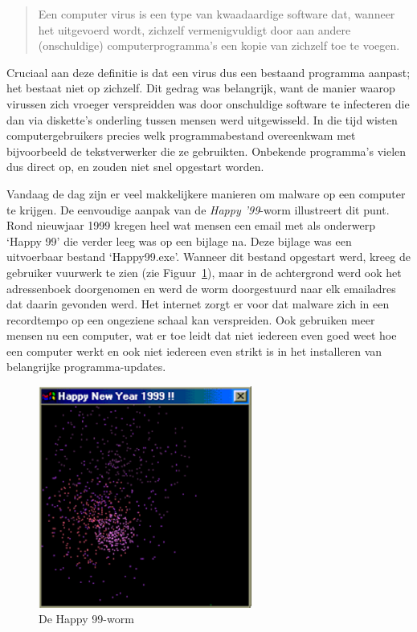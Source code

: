 \begin{quotation}
Een computer virus is een type van kwaadaardige software dat, wanneer het uitgevoerd wordt, zichzelf vermenigvuldigt door aan andere (onschuldige) computerprogramma's een kopie van zichzelf toe te voegen.
\end{quotation}

Cruciaal aan deze definitie is dat een virus dus een bestaand programma aanpast; het bestaat niet op zichzelf. Dit gedrag was belangrijk, want de manier waarop virussen zich vroeger verspreidden was door onschuldige software te infecteren die dan via diskette's onderling tussen mensen werd uitgewisseld. In die tijd wisten computergebruikers precies welk programmabestand overeenkwam met bijvoorbeeld de tekstverwerker die ze gebruikten. Onbekende programma's vielen dus direct op, en zouden niet snel opgestart worden.

Vandaag de dag zijn er veel makkelijkere manieren om malware op een computer te krijgen. De eenvoudige aanpak van de \emph{Happy '99}-worm illustreert dit punt. Rond nieuwjaar 1999 kregen heel wat mensen een email met als onderwerp `Happy 99' die verder leeg was op een bijlage na. Deze bijlage was een uitvoerbaar bestand `Happy99.exe'. Wanneer dit bestand opgestart werd, kreeg de gebruiker vuurwerk te zien (zie Figuur~\ref{happy99}), maar in de achtergrond werd ook het adressenboek doorgenomen en werd de worm doorgestuurd naar elk emailadres dat daarin gevonden werd. Het internet zorgt er voor dat malware zich in een recordtempo op een ongeziene schaal kan verspreiden. Ook gebruiken meer mensen nu een computer, wat er toe leidt dat niet iedereen even goed weet hoe een computer werkt en ook niet iedereen even strikt is in het installeren van belangrijke programma-updates. 

\begin{figure}
\begin{center}
\includegraphics[width=70mm]{images/happy99.png}
\end{center}
\caption{De Happy 99-worm}
\label{happy99}
\end{figure}

